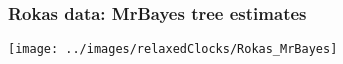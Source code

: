 \begin{frame}
\frametitle{Rokas data: MrBayes tree estimates}

\begin{centering}

\texttt{[image: ../images/relaxedClocks/Rokas\_MrBayes]}

\end{centering}

\end{frame}
